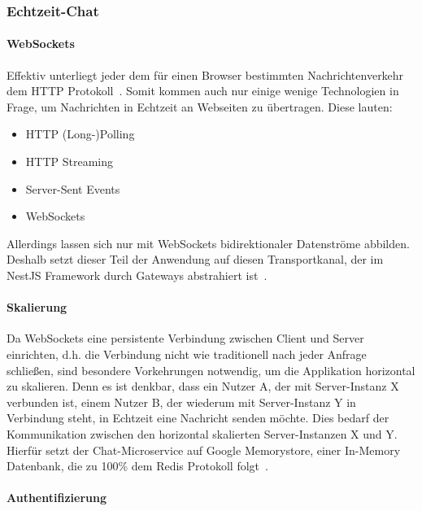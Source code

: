 \documentclass{article}
\begin{document}
\subsubsection{Echtzeit-Chat}

\paragraph{WebSockets}

Effektiv unterliegt jeder dem für einen Browser bestimmten Nachrichtenverkehr dem HTTP Protokoll~\cite[p.~1]{fallows2016enterprise}. Somit kommen auch nur einige wenige Technologien in Frage, um Nachrichten in Echtzeit an Webseiten zu übertragen. Diese lauten:

\begin{itemize}
  \item HTTP (Long-)Polling~\cite[p.~1]{gupta2004event}
  \item HTTP Streaming~\cite[p.~7]{loreto2011known}
  \item Server-Sent Events~\cite[pp.~43--44]{estep2013mobile} \cite[p.~13]{loreto2011known}
  \item WebSockets~\cite[p.~1]{fallows2016enterprise}
\end{itemize}

Allerdings lassen sich nur mit WebSockets bidirektionaler Datenströme abbilden. Deshalb setzt dieser Teil der Anwendung auf diesen Transportkanal, der im NestJS Framework durch Gateways abstrahiert ist~\cite{nestjs-gateway}.


\paragraph{Skalierung}

Da WebSockets eine persistente Verbindung zwischen Client und Server einrichten, d.h. die Verbindung nicht wie traditionell nach jeder Anfrage schließen, sind besondere Vorkehrungen notwendig, um die Applikation horizontal zu skalieren. Denn es ist denkbar, dass ein Nutzer A, der mit Server-Instanz X verbunden ist, einem Nutzer B, der wiederum mit Server-Instanz Y in Verbindung steht, in Echtzeit eine Nachricht senden möchte. Dies bedarf der Kommunikation zwischen den horizontal skalierten Server-Instanzen X und Y. Hierfür setzt der Chat-Microservice auf Google Memorystore, einer In-Memory Datenbank, die zu 100\% dem Redis Protokoll folgt~\cite{memorystore-redis}.

\paragraph{Authentifizierung}
\end{document}
